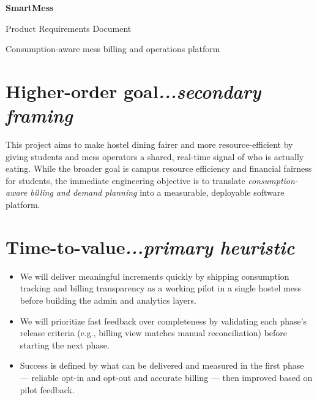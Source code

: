 \documentclass[12pt,a4paper]{article}
\newcommand{\secann}[1]{\hfill\normalfont\itshape #1}
\begin{document}
\begin{center}
    {\LARGE\bfseries SmartMess\par}
    \vspace{0.35em}
    {\large Product Requirements Document\par}
    \vspace{0.15em}
    {\normalsize Consumption-aware mess billing and operations platform\par}
\end{center}

\vspace{1em}

\section{Higher-order goal\secann{...secondary framing}}

This project aims to make hostel dining fairer and more resource-efficient by
giving students and mess operators a shared, real-time signal of who is
actually eating. While the broader goal is campus resource efficiency and
financial fairness for students, the immediate engineering objective is to
translate \textit{consumption-aware billing and demand planning} into a
measurable, deployable software platform.

\section{Time-to-value\secann{...primary heuristic}}

\begin{itemize}
    \item We will deliver meaningful increments quickly by shipping
    consumption tracking and billing transparency as a working pilot in a
    single hostel mess before building the admin and analytics layers.
    \item We will prioritize fast feedback over completeness by validating
    each phase's release criteria (e.g., billing view matches manual
    reconciliation) before starting the next phase.
    \item Success is defined by what can be delivered and measured in the
    first phase --- reliable opt-in and opt-out and accurate billing --- then
    improved based on pilot feedback.
\end{itemize}
\end{document}
